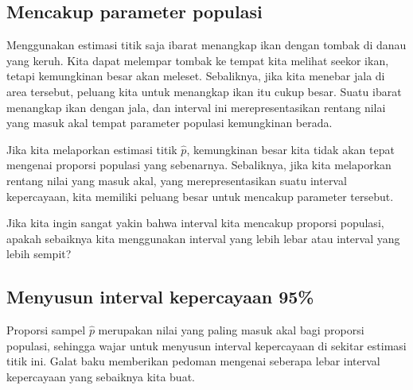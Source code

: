 \subsection{Mencakup parameter populasi}

Menggunakan estimasi titik saja ibarat menangkap ikan dengan tombak
di danau yang keruh. Kita dapat melempar tombak ke tempat kita
melihat seekor ikan, tetapi kemungkinan besar akan meleset. Sebaliknya,
jika kita menebar jala di area tersebut, peluang kita untuk
menangkap ikan itu cukup besar.
Suatu  ibarat menangkap ikan dengan jala,
dan interval ini merepresentasikan rentang nilai yang masuk akal tempat
parameter populasi kemungkinan berada.

Jika kita melaporkan estimasi titik $\hat{p}$, kemungkinan besar
kita tidak akan tepat mengenai proporsi populasi yang sebenarnya. Sebaliknya,
jika kita melaporkan rentang nilai yang masuk akal,
yang merepresentasikan suatu interval kepercayaan,
kita memiliki peluang besar untuk mencakup parameter tersebut.

\begin{exercisewrap}
\begin{nexercise}
Jika kita ingin sangat yakin bahwa interval kita mencakup proporsi
populasi, apakah sebaiknya kita menggunakan interval yang lebih lebar
atau interval yang lebih sempit?\footnotemark
\end{nexercise}
\end{exercisewrap}

\subsection{Menyusun interval kepercayaan 95\%}

Proporsi sampel $\hat{p}$ merupakan nilai yang paling masuk akal
bagi proporsi populasi, sehingga wajar untuk
menyusun interval kepercayaan di sekitar estimasi titik ini.
Galat baku
memberikan pedoman mengenai seberapa
lebar interval kepercayaan yang sebaiknya kita buat.


